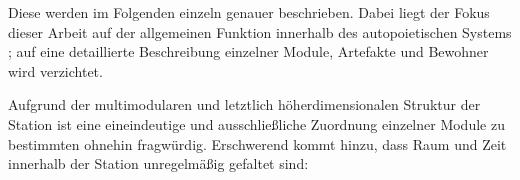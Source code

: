 \begin{newstuff}

    Diese  werden im Folgenden einzeln genauer beschrieben. Dabei liegt der Fokus dieser Arbeit auf der allgemeinen Funktion innerhalb des autopoietischen Systems ; auf eine detaillierte Beschreibung einzelner Module, Artefakte und Bewohner wird verzichtet. 
    
    Aufgrund der multimodularen und letztlich höherdimensionalen Struktur der Station ist eine eineindeutige und ausschließliche Zuordnung einzelner Module zu bestimmten  ohnehin fragwürdig. Erschwerend kommt hinzu, dass Raum und Zeit innerhalb der Station unregelmäßig gefaltet sind: 



\end{newstuff}
